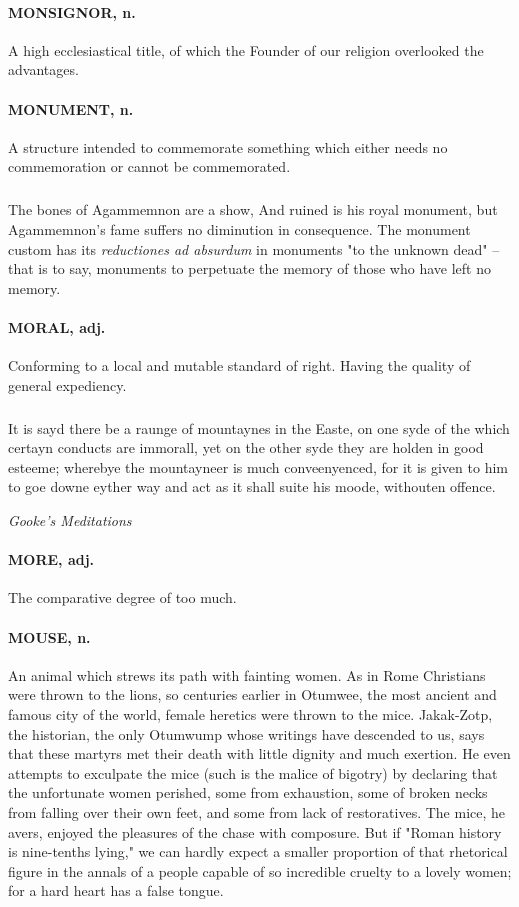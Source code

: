 \documentclass[11pt]{article}
\begin{document}
\paragraph{MONSIGNOR, n.}  A high ecclesiastical title, of which the Founder of
our religion overlooked the advantages.

\paragraph{MONUMENT, n.}  A structure intended to commemorate something which
either needs no commemoration or cannot be commemorated.

\subparagraph{}   The bones of Agammemnon are a show,
  And ruined is his royal monument,
but Agammemnon's fame suffers no diminution in consequence.  The
monument custom has its {\em reductiones ad absurdum} in monuments "to the
unknown dead" -- that is to say, monuments to perpetuate the memory of
those who have left no memory.

\paragraph{MORAL, adj.}  Conforming to a local and mutable standard of right.
Having the quality of general expediency.

\subparagraph{}       It is sayd there be a raunge of mountaynes in the Easte, on
one syde of the which certayn conducts are immorall, yet on the other
syde they are holden in good esteeme; wherebye the mountayneer is much
conveenyenced, for it is given to him to goe downe eyther way and act
as it shall suite his moode, withouten offence.

{\em Gooke's Meditations}


\paragraph{MORE, adj.}  The comparative degree of too much.

\paragraph{MOUSE, n.}  An animal which strews its path with fainting women.  As in
Rome Christians were thrown to the lions, so centuries earlier in
Otumwee, the most ancient and famous city of the world, female
heretics were thrown to the mice.  Jakak-Zotp, the historian, the only
Otumwump whose writings have descended to us, says that these martyrs
met their death with little dignity and much exertion.  He even
attempts to exculpate the mice (such is the malice of bigotry) by
declaring that the unfortunate women perished, some from exhaustion,
some of broken necks from falling over their own feet, and some from
lack of restoratives.  The mice, he avers, enjoyed the pleasures of
the chase with composure.  But if "Roman history is nine-tenths
lying," we can hardly expect a smaller proportion of that rhetorical
figure in the annals of a people capable of so incredible cruelty to a
lovely women; for a hard heart has a false tongue.
\end{document}
